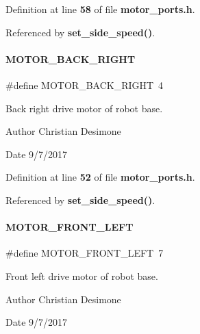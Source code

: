 Definition at line \textbf{ 58} of file \textbf{ motor\+\_\+ports.\+h}.



Referenced by \textbf{ set\+\_\+side\+\_\+speed()}.

\mbox{\label{motor__ports_8h_ad85c5f3d6a2d00789c8c67b960c46c2b}} 
\paragraph{M\+O\+T\+O\+R\+\_\+\+B\+A\+C\+K\+\_\+\+R\+I\+G\+HT}
{\footnotesize\ttfamily \#define M\+O\+T\+O\+R\+\_\+\+B\+A\+C\+K\+\_\+\+R\+I\+G\+HT~4}



Back right drive motor of robot base. 

\begin{DoxyAuthor}{Author}
Christian Desimone 
\end{DoxyAuthor}
\begin{DoxyDate}{Date}
9/7/2017 
\end{DoxyDate}


Definition at line \textbf{ 52} of file \textbf{ motor\+\_\+ports.\+h}.



Referenced by \textbf{ set\+\_\+side\+\_\+speed()}.

\mbox{\label{motor__ports_8h_a743b47e164fb23b30f4f2f228db0b338}} 
\paragraph{M\+O\+T\+O\+R\+\_\+\+F\+R\+O\+N\+T\+\_\+\+L\+E\+FT}
{\footnotesize\ttfamily \#define M\+O\+T\+O\+R\+\_\+\+F\+R\+O\+N\+T\+\_\+\+L\+E\+FT~7}



Front left drive motor of robot base. 

\begin{DoxyAuthor}{Author}
Christian Desimone 
\end{DoxyAuthor}
\begin{DoxyDate}{Date}
9/7/2017 
\end{DoxyDate}


